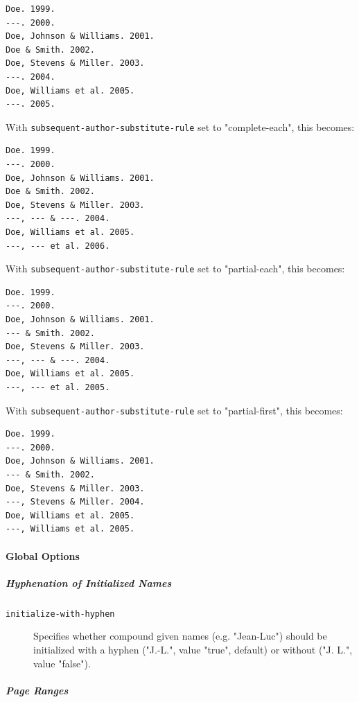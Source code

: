 \begin{description}
\begin{verbatim}
Doe. 1999.
---. 2000.
Doe, Johnson & Williams. 2001.
Doe & Smith. 2002.
Doe, Stevens & Miller. 2003.
---. 2004.
Doe, Williams et al. 2005.
---. 2005.
\end{verbatim}

With \texttt{subsequent-author-substitute-rule} set to "complete-each",
this becomes:

\begin{verbatim}
Doe. 1999.
---. 2000.
Doe, Johnson & Williams. 2001.
Doe & Smith. 2002.
Doe, Stevens & Miller. 2003.
---, --- & ---. 2004.
Doe, Williams et al. 2005.
---, --- et al. 2006.
\end{verbatim}

With \texttt{subsequent-author-substitute-rule} set to "partial-each",
this becomes:

\begin{verbatim}
Doe. 1999.
---. 2000.
Doe, Johnson & Williams. 2001.
--- & Smith. 2002.
Doe, Stevens & Miller. 2003.
---, --- & ---. 2004.
Doe, Williams et al. 2005.
---, --- et al. 2005.
\end{verbatim}

With \texttt{subsequent-author-substitute-rule} set to "partial-first",
this becomes:

\begin{verbatim}
Doe. 1999.
---. 2000.
Doe, Johnson & Williams. 2001.
--- & Smith. 2002.
Doe, Stevens & Miller. 2003.
---, Stevens & Miller. 2004.
Doe, Williams et al. 2005.
---, Williams et al. 2005.
\end{verbatim}
\end{description}

\hypertarget{global-options}{%
\paragraph{Global Options}\label{global-options}}

\hypertarget{hyphenation-of-initialized-names}{%
\subparagraph{Hyphenation of Initialized
Names}\label{hyphenation-of-initialized-names}}

\begin{description}
\item[\texttt{initialize-with-hyphen}]
Specifies whether compound given names (e.g. "Jean-Luc") should be
initialized with a hyphen ("J.-L.", value "true", default) or without
("J. L.", value "false").
\end{description}

\hypertarget{page-ranges}{%
\subparagraph{Page Ranges}\label{page-ranges}}

